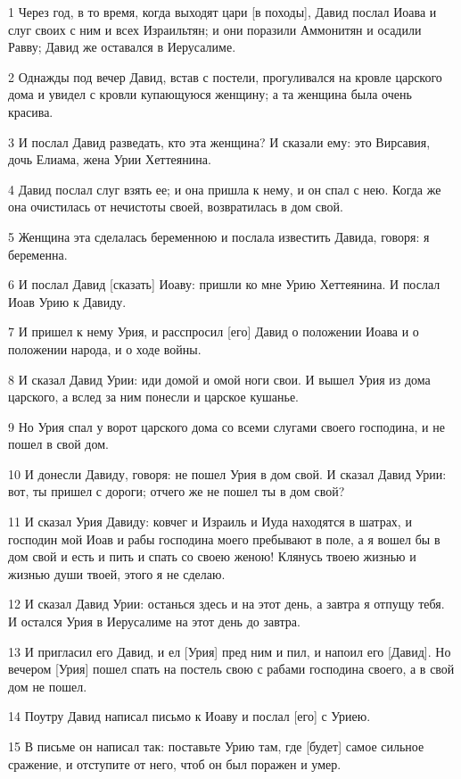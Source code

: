 \par 1 Через год, в то время, когда выходят цари [в походы], Давид послал Иоава и слуг своих с ним и всех Израильтян; и они поразили Аммонитян и осадили Равву; Давид же оставался в Иерусалиме.
\par 2 Однажды под вечер Давид, встав с постели, прогуливался на кровле царского дома и увидел с кровли купающуюся женщину; а та женщина была очень красива.
\par 3 И послал Давид разведать, кто эта женщина? И сказали ему: это Вирсавия, дочь Елиама, жена Урии Хеттеянина.
\par 4 Давид послал слуг взять ее; и она пришла к нему, и он спал с нею. Когда же она очистилась от нечистоты своей, возвратилась в дом свой.
\par 5 Женщина эта сделалась беременною и послала известить Давида, говоря: я беременна.
\par 6 И послал Давид [сказать] Иоаву: пришли ко мне Урию Хеттеянина. И послал Иоав Урию к Давиду.
\par 7 И пришел к нему Урия, и расспросил [его] Давид о положении Иоава и о положении народа, и о ходе войны.
\par 8 И сказал Давид Урии: иди домой и омой ноги свои. И вышел Урия из дома царского, а вслед за ним понесли и царское кушанье.
\par 9 Но Урия спал у ворот царского дома со всеми слугами своего господина, и не пошел в свой дом.
\par 10 И донесли Давиду, говоря: не пошел Урия в дом свой. И сказал Давид Урии: вот, ты пришел с дороги; отчего же не пошел ты в дом свой?
\par 11 И сказал Урия Давиду: ковчег и Израиль и Иуда находятся в шатрах, и господин мой Иоав и рабы господина моего пребывают в поле, а я вошел бы в дом свой и есть и пить и спать со своею женою! Клянусь твоею жизнью и жизнью души твоей, этого я не сделаю.
\par 12 И сказал Давид Урии: останься здесь и на этот день, а завтра я отпущу тебя. И остался Урия в Иерусалиме на этот день до завтра.
\par 13 И пригласил его Давид, и ел [Урия] пред ним и пил, и напоил его [Давид]. Но вечером [Урия] пошел спать на постель свою с рабами господина своего, а в свой дом не пошел.
\par 14 Поутру Давид написал письмо к Иоаву и послал [его] с Уриею.
\par 15 В письме он написал так: поставьте Урию там, где [будет] самое сильное сражение, и отступите от него, чтоб он был поражен и умер.
